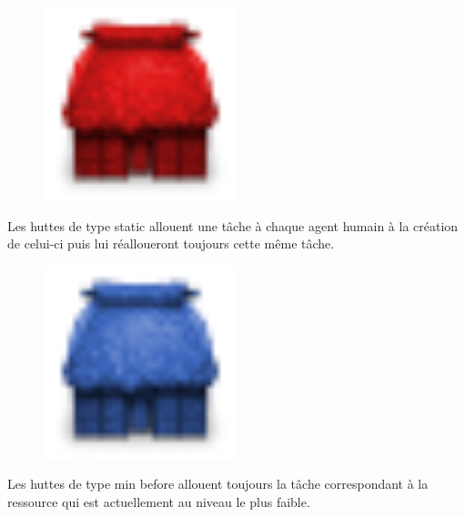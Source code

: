 \begin{minipage}[H]{0.1\linewidth}
  \begin{figure}[H]
    \begin{center}
      \includegraphics[width=0.5\textwidth]{./img/hut_static}
    \end{center}
  \end{figure}
\end{minipage}
\begin{minipage}[H]{0.9\linewidth}
  Les huttes de type \og{}static\fg{} allouent une tâche à chaque agent
  humain à la création de celui-ci puis lui réalloueront toujours cette même tâche.
\end{minipage}

\begin{minipage}[H]{0.1\linewidth}
  \begin{figure}[H]
    \begin{center}
      \includegraphics[width=0.5\textwidth]{./img/hut_min_before}
    \end{center}
  \end{figure}
\end{minipage}
\begin{minipage}[H]{0.9\linewidth}
  Les huttes de type \og{}min before\fg{} allouent toujours la tâche
  correspondant à la ressource qui est actuellement au niveau le plus faible.
\end{minipage}

